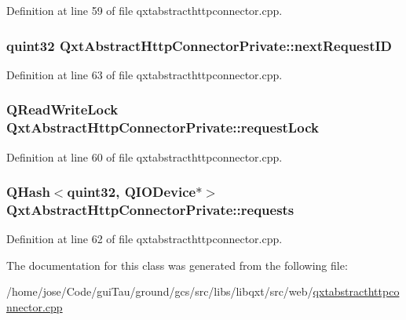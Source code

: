 Definition at line 59 of file qxtabstracthttpconnector.\-cpp.

\hypertarget{class_qxt_abstract_http_connector_private_a752362c7063a2806494e8d535b694a10}{
\subsubsection[{next\-Request\-I\-D}]{\setlength{\rightskip}{0pt plus 5cm}quint32 Qxt\-Abstract\-Http\-Connector\-Private\-::next\-Request\-I\-D}}\label{class_qxt_abstract_http_connector_private_a752362c7063a2806494e8d535b694a10}


Definition at line 63 of file qxtabstracthttpconnector.\-cpp.

\hypertarget{class_qxt_abstract_http_connector_private_a20a774a1e4d71f7928da0cf4d5291149}{
\subsubsection[{request\-Lock}]{\setlength{\rightskip}{0pt plus 5cm}Q\-Read\-Write\-Lock Qxt\-Abstract\-Http\-Connector\-Private\-::request\-Lock}}\label{class_qxt_abstract_http_connector_private_a20a774a1e4d71f7928da0cf4d5291149}


Definition at line 60 of file qxtabstracthttpconnector.\-cpp.

\hypertarget{class_qxt_abstract_http_connector_private_ad7acad08602819410ff53b50c806b7aa}{
\subsubsection[{requests}]{\setlength{\rightskip}{0pt plus 5cm}Q\-Hash$<$quint32, Q\-I\-O\-Device$\ast$$>$ Qxt\-Abstract\-Http\-Connector\-Private\-::requests}}\label{class_qxt_abstract_http_connector_private_ad7acad08602819410ff53b50c806b7aa}


Definition at line 62 of file qxtabstracthttpconnector.\-cpp.



The documentation for this class was generated from the following file\-:\begin{DoxyCompactItemize}
\item 
/home/jose/\-Code/gui\-Tau/ground/gcs/src/libs/libqxt/src/web/\hyperlink{qxtabstracthttpconnector_8cpp}{qxtabstracthttpconnector.\-cpp}\end{DoxyCompactItemize}
